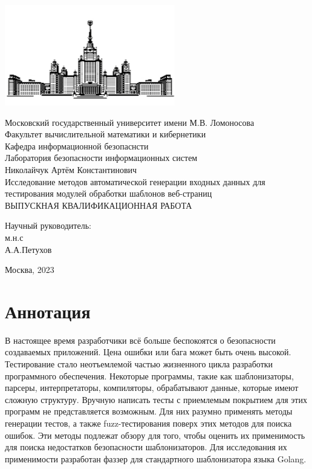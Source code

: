 \documentclass[a4paper]{article}
\begin{document}
 
\begin{center}
\includegraphics{MSU}

\hfill \break
\normalsize{Московский государственный университет имени М.В. Ломоносова}\\
\normalsize{Факультет вычислительной математики и кибернетики}\\
\normalsize{Кафедра информационной безопаснсти}\\
\normalsize{Лаборатория безопасности информационных систем}\\
 \hfill \break
\normalsize{Николайчук Артём Константинович}\\
\hfill\break
\hfill \break
\hfill \break
\hfill \break
\large{Исследование методов автоматической генерации входных данных для тестирования модулей обработки шаблонов веб-страниц}\\
\hfill \break
\hfill \break
\hfill \break
\normalsize{ВЫПУСКНАЯ КВАЛИФИКАЦИОННАЯ РАБОТА}\\
\hfill \break
\hfill \break
\hfill \break
\hfill \break
\hfill \break
\hfill \break
\hfill \break
\hfill \break
\begin{flushright}
    \normalsize{Научный руководитель:}\\
    \normalsize{м.н.с}\\
    \normalsize{А.А.Петухов}\\
\end{flushright}
\end{center}
\vspace*{\fill}
\begin{center} Москва, 2023 \end{center}
\thispagestyle{empty}
 
\newpage
\section*{Аннотация}
\indent

В настоящее время разработчики всё больше беспокоятся о безопасности создаваемых приложений. Цена ошибки или бага может быть очень высокой. Тестирование стало неотъемлемой частью жизненного цикла разработки программного обеспечения. Некоторые программы, такие как шаблонизаторы, парсеры, интерпретаторы, компиляторы, обрабатывают данные, которые имеют сложную структуру. Вручную написать тесты с приемлемым покрытием для этих программ не представляется возможным. Для них разумно применять методы генерации тестов, а также fuzz-тестирования поверх этих методов для поиска ошибок. Эти методы подлежат обзору для того, чтобы оценить их
применимость для поиска недостатков безопасности шаблонизаторов. Для исследования их применимости разработан фаззер для стандартного шаблонизатора языка Golang.
\newpage
    \tableofcontents
\newpage
 
\end{document}
